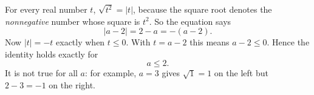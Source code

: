 For every real number $t$, $\sqrt{t^2}=|t|$, because the square root denotes the \emph{nonnegative} number whose square is $t^2$. So the equation says
\[
|a-2|=2-a=-(a-2).
\]
Now $|t|=-t$ exactly when $t\le0$. With $t=a-2$ this means $a-2\le0$. Hence the identity holds exactly for
\[
\boxed{a\le2}.
\]
It is not true for all $a$: for example, $a=3$ gives $\sqrt{1}=1$ on the left but $2-3=-1$ on the right.

